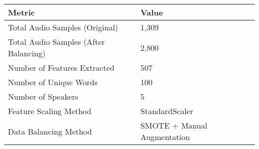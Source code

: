 \begin{tabular}{ll}
\toprule
Metric & Value \\
\midrule
Total Audio Samples (Original) & 1,309 \\
Total Audio Samples (After Balancing) & 2,800 \\
Number of Features Extracted & 507 \\
Number of Unique Words & 100 \\
Number of Speakers & 5 \\
Feature Scaling Method & StandardScaler \\
Data Balancing Method & SMOTE + Manual Augmentation \\
\bottomrule
\end{tabular}
